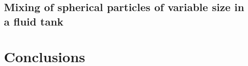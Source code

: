 \documentclass[preprint,12pt]{elsarticle}
\begin{document}
\FloatBarrier%
\subsection{Mixing of spherical particles of variable size in a fluid tank}
\label{sec:mixing-spherical-particles-in-fluid-tank}





\FloatBarrier%
\section{Conclusions}
\label{sec:conclusions}






\end{document}
